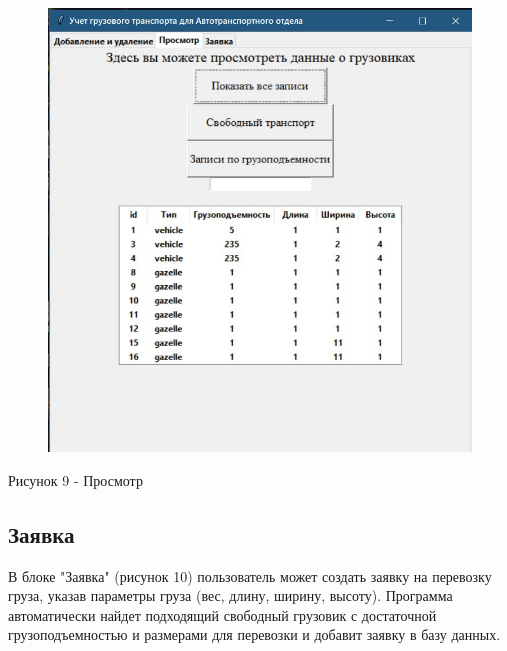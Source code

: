 \documentclass[14pt]{extreport}
\begin{document}
\begin{figure}[H]
    \centering
    \includegraphics[scale=0.7]{3.jpg}
\end{figure}
\begin{center}
    Рисунок 9 - Просмотр
\end{center}

\subsection{Заявка}

В блоке "Заявка" (рисунок 10) пользователь может создать заявку на перевозку груза, указав параметры груза (вес, длину, ширину, высоту). Программа автоматически найдет подходящий свободный грузовик с достаточной грузоподъемностью и размерами для перевозки и добавит заявку в базу данных.
\end{document}
